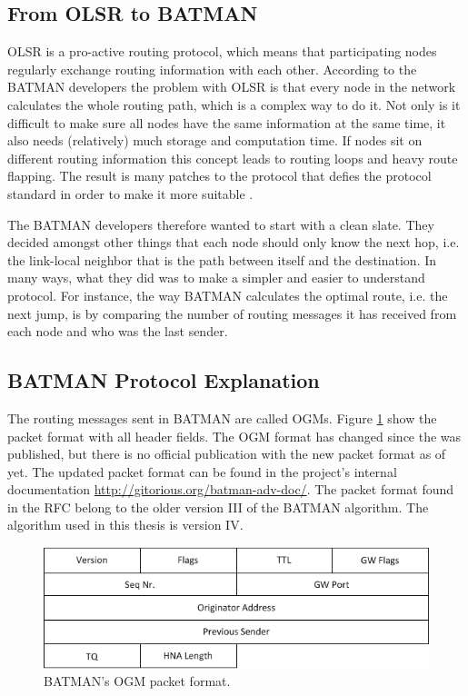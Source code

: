 \subsection{From OLSR to BATMAN}
OLSR is a pro-active routing protocol, which means that participating nodes
regularly exchange routing information with each other. According to the BATMAN
developers the problem with OLSR is that every node in the network calculates
the whole routing path, which is a complex way to do it. Not only is it
difficult to make sure all nodes have the same information at the same time,
it also needs (relatively) much storage and computation time. If nodes sit on
different routing information this concept leads to routing loops and heavy
route flapping. The result is many patches to the protocol that defies the
protocol standard in order to make it more suitable \cite{why-starting-batman}.

The BATMAN developers therefore wanted to start with a clean slate. They decided
amongst other things that each node should only know the next hop, i.e. the
link-local neighbor that is the path between itself and the destination. In
many ways, what they did was to make a simpler and easier to understand
protocol. For instance, the way BATMAN calculates the optimal route, i.e. the
next jump, is by comparing the number of routing messages it has received from
each node and who was the last sender.

\subsection{BATMAN Protocol Explanation}
The routing messages sent in BATMAN are called \acp{OGM}. Figure
\ref{fig:original_ogm} show the packet format with all header fields. The
\ac{OGM} format has changed since the \cite{batman_rfc} was published, but there
is no official publication with the new packet format as of yet. The updated
packet format can be found in the project's internal documentation
\url{http://gitorious.org/batman-adv-doc/}. The packet format found in the RFC
belong to the older version III of the BATMAN algorithm. The algorithm used in
this thesis is version IV.

\begin{figure}[h]
	\centering
  	\includegraphics[width=\textwidth]{images/original_ogm.png}
  	\caption{BATMAN's \acf{OGM} packet format.}
	\label{fig:original_ogm}
\end{figure}

